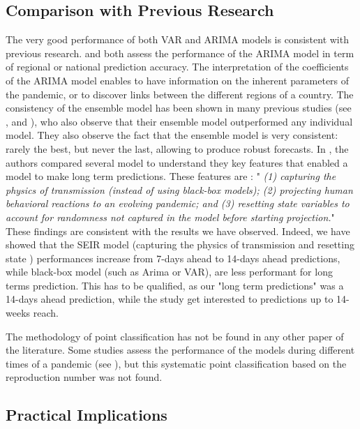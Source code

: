 \subsection{Comparison with Previous Research}

The very good performance of both VAR and ARIMA models is consistent with previous research. 
\cite{kufel2020arima} and \cite{shang2021regional} both assess the performance of the ARIMA model in term of regional or national prediction accuracy. 
The interpretation of the coefficients of the ARIMA model enables to have information on the inherent parameters of the pandemic, or to discover links between the different regions of a country. 
The consistency of the ensemble model has been shown in many previous studies (see \cite{cramer2022evaluation}, \cite{VIBOUD201813} and \cite{reich2019accuracy}), who also observe that their ensemble model outperformed any individual model. 
They also observe the fact that the ensemble model is very consistent: rarely the best, but never the last, allowing to produce robust forecasts. 
In \cite{rahmandad2022enhancing}, the authors compared several model to understand they key features that enabled a model to make long term predictions. 
These features are : " \textit{(1) capturing the physics of transmission (instead of using black-box models); (2) projecting human behavioral reactions to an evolving pandemic; and (3) resetting state variables to account for randomness not captured in the model before starting projection.}"
These findings are consistent with the results we have observed. 
Indeed, we have showed that the SEIR model (capturing the physics of transmission and resetting state ) performances increase from 7-days ahead to 14-days ahead predictions, while black-box model (such as Arima or VAR), are less performant for long terms prediction. 
This has to be qualified, as our "long term predictions" was a 14-days ahead prediction, while the study \cite{rahmandad2022enhancing} get interested to predictions up to 14-weeks reach. 

The methodology of point classification has not be found in any other paper of the literature. 
Some studies assess the performance of the models during different times of a pandemic (see \cite{howerton2023evaluation}), but this systematic point classification based on the reproduction number was not found. 

\subsection{Practical Implications}

